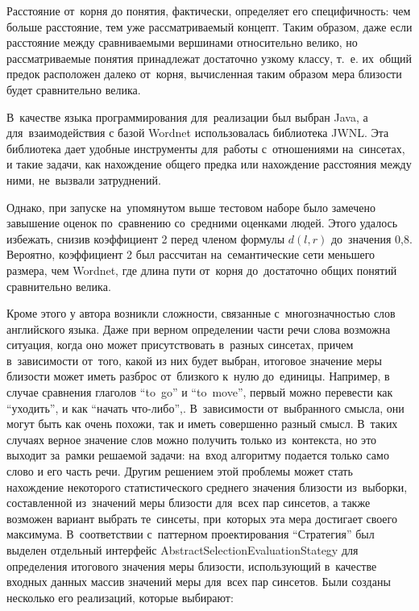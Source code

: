 Расстояние от~корня до понятия, фактически, определяет его специфичность:
чем больше расстояние, тем уже рассматриваемый концепт.
Таким образом, даже если расстояние между сравниваемыми вершинами относительно велико, 
но рассматриваемые понятия принадлежат достаточно узкому классу, 
т.~е. их~общий предок расположен далеко от~корня,
вычисленная таким образом мера близости будет сравнительно велика.

В~качестве языка программирования для~реализации был выбран Java,
а для~взаимодействия с базой Wordnet использовалась библиотека JWNL\cite{jwnl}.
Эта библиотека дает удобные инструменты для~работы с~отношениями на~синсетах,
и такие задачи, как нахождение общего предка или нахождение расстояния между ними, не~вызвали затруднений.

Однако, при запуске на~упомянутом выше тестовом наборе 
было замечено завышение оценок по~сравнению со~средними оценками людей.
Этого удалось избежать, снизив коэффициент 2 перед членом формулы $d(l,r)$ до~значения 0,8. 
Вероятно, коэффициент 2 был рассчитан на~семантические сети меньшего размера,  чем Wordnet, 
где длина пути от~корня до~достаточно общих понятий сравнительно велика.

Кроме этого у  автора возникли сложности, связанные с~многозначностью слов английского языка.
Даже при верном определении части речи слова возможна ситуация, 
когда оно может присутствовать в~разных синсетах, 
причем в~зависимости от~того, какой из них будет выбран,
итоговое значение меры близости может иметь разброс от~близкого к~нулю до~единицы.
Например, в случае сравнения глаголов ``to~go'' и ``to~move'',  
первый можно перевести как ``уходить'',
и как ``начать что-либо'',.
В~зависимости от~выбранного смысла, они могут быть как очень похожи,
так и иметь совершенно разный смысл.
В~таких случаях верное значение слов можно получить только из~контекста, 
но это выходит за~рамки решаемой задачи: 
на~вход алгоритму подается только само слово и его часть речи.
Другим решением этой проблемы может стать нахождение некоторого статистического среднего значения близости из~выборки, 
составленной из~значений меры близости для~всех пар синсетов,
а также возможен вариант выбрать те~синсеты, при~которых эта мера достигает своего максимума.
В~соответствии с~паттерном проектирования ``Стратегия'' \cite{strategy} 
был выделен отдельный интерфейс AbstractSelectionEvaluationStategy для определения итогового значения меры близости, 
использующий в~качестве входных данных массив значений меры для~всех пар синсетов.
Были созданы несколько его реализаций, которые выбирают:

